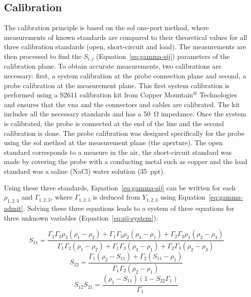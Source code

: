 \subsection{Calibration}\label{subsec:metho-calib}
The calibration principle is based on the \ac{sol} one-port method, where measurements of known standards are compared to their theoretical values for all three calibration standards (open, short-circuit and load).
The measurements are then processed to find the \(S_{i,j}\) (Equation~\ref{eq:gamma-sij}) parameters of the calibration plane.
To obtain accurate measurements, two calibrations are necessary: first, a system calibration at the probe connection plane and second, a probe calibration at the measurement plane.
This first system calibration is performed using a S2611 calibration kit from Copper Mountain\(^\text{\textregistered}\) Technologies and ensures that the \ac{vna} and the connectors and cables are calibrated.
The kit includes all the necessary standards and has a \SI{50}{\ohm} impedance.
Once the system is calibrated, the probe is connected at the end of the line and the second calibration is done.
The probe calibration was designed specifically for the probe using the \ac{sol} method at the measurement plane (the aperture).
The open standard corresponds to a measure in the air, the short-circuit standard was made by covering the probe with a conducting metal such as copper and the load standard was a saline (NaCl) water solution (\qty{35}{ppt}).

Using these three standards, Equation~\ref{eq:gamma-sij} can be written for each \(\rho_{1,2,3}\) and \(\Gamma_{1,2,3}\), where \(\Gamma_{1,2,3}\) is deduced from \(Y_{1,2,3}\) using Equation~\ref{eq:gamma-admit}.
Solving these three equations leads to a system of three equations for three unknown variables (Equation~\ref{eq:sij-system}):

{\footnotesize
\begin{equation*}
    S_{11} = \frac{\Gamma_1\Gamma_2\rho_3(\rho_1-\rho_2) + 
                   \Gamma_1\Gamma_3\rho_2(\rho_3-\rho_1) + 
                   \Gamma_2\Gamma_3\rho_1(\rho_2-\rho_3)}
                  {\Gamma_1\Gamma_2(\rho_1-\rho_2) + 
                   \Gamma_1\Gamma_3(\rho_3-\rho_1) +
                   \Gamma_2\Gamma_3(\rho_2-\rho_3)}
\end{equation*}
%
\begin{equation}\label{eq:sij-system}
    S_{22} = \frac{\Gamma_1(\rho_2-S_{11}) + \Gamma_2(S_{11}-\rho_1)}       
                  {\Gamma_1\Gamma_2(\rho_2-\rho_1)}
\end{equation}
%
\begin{equation*}
    S_{12}S_{21} = \frac{(\rho_1-S_{11})(1-S_{22}\Gamma_1)}{\Gamma_1}
\end{equation*}}%

